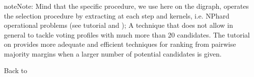\documentclass[a4paper,12pt,english]{sphinxhowto}
\begin{document}
\begin{sphinxadmonition}{note}{Note:}
Mind that the specific  procedure, we use here on the  digraph, operates the selection procedure by extracting at each step  and  kernels, i.e. NP\sphinxhyphen{}hard operational problems (see tutorial {\hyperref[\detokenize{tutorial:kernel-tutorial-label}]{}} and ); A technique that does not allow in general to tackle voting profiles with much more than 20 candidates. The tutorial on {\hyperref[\detokenize{tutorial:ranking-tutorial-label}]{}} provides more adequate and efficient techniques for ranking from pairwise majority margins when a larger number of potential candidates is given.
\end{sphinxadmonition}

Back to {\hyperref[\detokenize{tutorial:tutorial-label}]{}}
\end{document}
